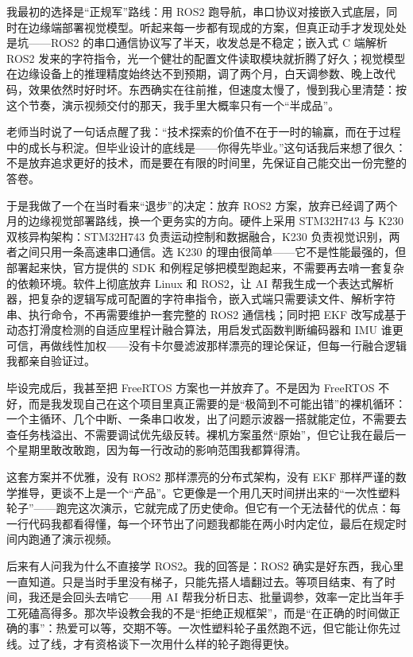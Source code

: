 我最初的选择是“正规军”路线：用 ROS2 跑导航，串口协议对接嵌入式底层，同时在边缘端部署视觉模型。听起来每一步都有现成的方案，但真正动手才发现处处是坑——ROS2 的串口通信协议写了半天，收发总是不稳定；嵌入式 C 端解析 ROS2 发来的字符指令，光一个健壮的配置文件读取模块就折腾了好久；视觉模型在边缘设备上的推理精度始终达不到预期，调了两个月，白天调参数、晚上改代码，效果依然时好时坏。东西确实在往前推，但速度太慢了，慢到我心里清楚：按这个节奏，演示视频交付的那天，我手里大概率只有一个“半成品”。

老师当时说了一句话点醒了我：“技术探索的价值不在于一时的输赢，而在于过程中的成长与积淀。但毕业设计的底线是——你得先毕业。”这句话我后来想了很久：不是放弃追求更好的技术，而是要在有限的时间里，先保证自己能交出一份完整的答卷。

于是我做了一个在当时看来“退步”的决定：放弃 ROS2 方案，放弃已经调了两个月的边缘视觉部署路线，换一个更务实的方向。硬件上采用 STM32H743 与 K230 双核异构架构：STM32H743 负责运动控制和数据融合，K230 负责视觉识别，两者之间只用一条高速串口通信。选 K230 的理由很简单——它不是性能最强的，但部署起来快，官方提供的 SDK 和例程足够把模型跑起来，不需要再去啃一套复杂的依赖环境。软件上彻底放弃 Linux 和 ROS2，让 AI 帮我生成一个表达式解析器，把复杂的逻辑写成可配置的字符串指令，嵌入式端只需要读文件、解析字符串、执行命令，不再需要维护一套完整的 ROS2 通信栈；同时把 EKF 改写成基于动态打滑度检测的自适应里程计融合算法，用启发式函数判断编码器和 IMU 谁更可信，再做线性加权——没有卡尔曼滤波那样漂亮的理论保证，但每一行融合逻辑我都亲自验证过。

毕设完成后，我甚至把 FreeRTOS 方案也一并放弃了。不是因为 FreeRTOS 不好，而是我发现自己在这个项目里真正需要的是“极简到不可能出错”的裸机循环：一个主循环、几个中断、一条串口收发，出了问题示波器一搭就能定位，不需要去查任务栈溢出、不需要调试优先级反转。裸机方案虽然“原始”，但它让我在最后一个星期里敢改敢跑，因为每一行改动的影响范围我都算得清。

这套方案并不优雅，没有 ROS2 那样漂亮的分布式架构，没有 EKF 那样严谨的数学推导，更谈不上是一个“产品”。它更像是一个用几天时间拼出来的“一次性塑料轮子”——跑完这次演示，它就完成了历史使命。但它有一个无法替代的优点：每一行代码我都看得懂，每一个环节出了问题我都能在两小时内定位，最后在规定时间内跑通了演示视频。

后来有人问我为什么不直接学 ROS2。我的回答是：ROS2 确实是好东西，我心里一直知道。只是当时手里没有梯子，只能先搭人墙翻过去。等项目结束、有了时间，我还是会回头去啃它——用 AI 帮我分析日志、批量调参，效率一定比当年手工死磕高得多。那次毕设教会我的不是“拒绝正规框架”，而是“在正确的时间做正确的事”：热爱可以等，交期不等。一次性塑料轮子虽然跑不远，但它能让你先过线。过了线，才有资格谈下一次用什么样的轮子跑得更快。

